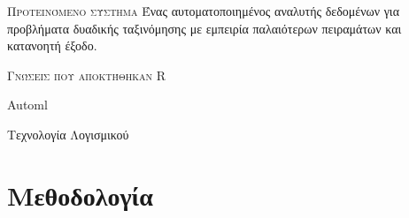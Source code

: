 \documentclass{beamer}
\begin{document}
  \begin{frame} { \scshape Προτεινόμενο σύστημα}
  	Ένας \alert{αυτοματοποιημένος} αναλυτής δεδομένων για προβλήματα δυαδικής ταξινόμησης με \alert{εμπειρία} παλαιότερων πειραμάτων και \alert{κατανοητή} έξοδο.
  	
  \end{frame}
  
  \begin{frame} { \scshape Γνώσεις που αποκτήθηκαν}
  	R
  	
  	Automl
  	
  	Τεχνολογία Λογισμικού
  	
  \end{frame}
  \section{Μεθοδολογία}
\end{document}
